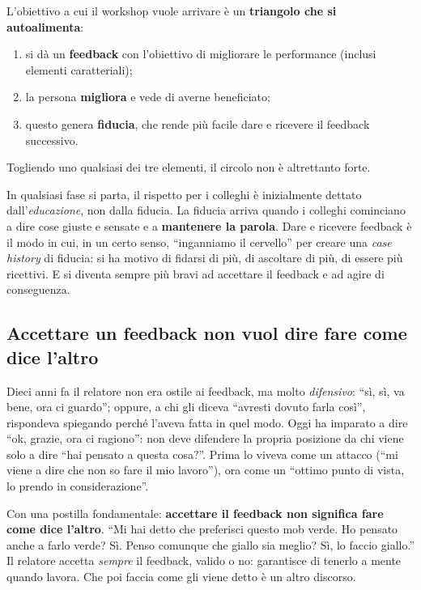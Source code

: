L'obiettivo a cui il workshop vuole arrivare è un \textbf{triangolo che si
autoalimenta}:
\begin{enumerate}
  \item si dà un \textbf{feedback} con l'obiettivo di migliorare le
        performance (inclusi elementi caratteriali);
  \item la persona \textbf{migliora} e vede di averne beneficiato;
  \item questo genera \textbf{fiducia}, che rende più facile dare e ricevere
        il feedback successivo.
\end{enumerate}
Togliendo uno qualsiasi dei tre elementi, il circolo non è altrettanto forte.

In qualsiasi fase si parta, il rispetto per i colleghi è inizialmente dettato
dall'\emph{educazione}, non dalla fiducia. La fiducia arriva quando i colleghi
cominciano a dire cose giuste e sensate e a \textbf{mantenere la parola}.
Dare e ricevere feedback è il modo in cui, in un certo senso,
``inganniamo il cervello'' per creare una \emph{case history} di fiducia: si
ha motivo di fidarsi di più, di ascoltare di più, di essere più ricettivi. E
si diventa sempre più bravi ad accettare il feedback e ad agire di
conseguenza.

\subsection{Accettare un feedback non vuol dire fare come dice l'altro}

Dieci anni fa il relatore non era ostile ai feedback, ma molto
\emph{difensivo}: ``sì, sì, va bene, ora ci guardo''; oppure, a chi gli diceva
``avresti dovuto farla così'', rispondeva spiegando perché l'aveva fatta in
quel modo. Oggi ha imparato a dire ``ok, grazie, ora ci ragiono'': non deve
difendere la propria posizione da chi viene solo a dire ``hai pensato a
questa cosa?''. Prima lo viveva come un attacco (``mi viene a dire che non so
fare il mio lavoro''), ora come un ``ottimo punto di vista, lo prendo in
considerazione''.

Con una postilla fondamentale: \textbf{accettare il feedback non significa
fare come dice l'altro}. ``Mi hai detto che preferisci questo mob verde. Ho
pensato anche a farlo verde? Sì. Penso comunque che giallo sia meglio? Sì, lo
faccio giallo.'' Il relatore accetta \emph{sempre} il feedback, valido o no:
garantisce di tenerlo a mente quando lavora. Che poi faccia come gli viene
detto è un altro discorso.

